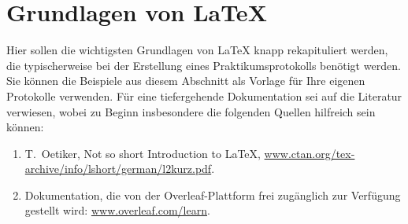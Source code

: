 \documentclass[twoside]{protokoll}
\begin{document}
%
%
%
%

%

%
%

%
%

%
%

%

%
%
\clearpage
\section*{Grundlagen von \LaTeX}
Hier sollen die wichtigsten Grundlagen von \LaTeX{} knapp rekapituliert
werden, die typischerweise bei der Erstellung eines
Praktikumsprotokolls benötigt werden. Sie können die Beispiele aus
diesem Abschnitt als Vorlage für Ihre eigenen Protokolle
verwenden. Für eine tiefergehende Dokumentation sei auf die Literatur
verwiesen, wobei zu Beginn insbesondere die folgenden Quellen
hilfreich sein können:
\begin{enumerate}
\item T.~Oetiker, Not so short Introduction to \LaTeX,
  \url{www.ctan.org/tex-archive/info/lshort/german/l2kurz.pdf}.
\item Dokumentation, die von der Overleaf-Plattform frei zugänglich
  zur Verfügung gestellt wird: \url{www.overleaf.com/learn}.
\end{enumerate}
\end{document}
